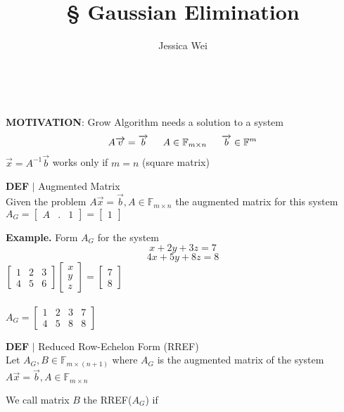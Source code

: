 \documentclass [12pt]{article}
\begin{document}
\begin{center}\title*{\Large \S {} Gaussian Elimination}\\\author*{Jessica Wei} \end{center}
\normalsize
\noindent\textbf{MOTIVATION}: Grow Algorithm needs a solution to a system 
\[A\overrightarrow{v}=\overrightarrow{b}\indent A\in\mathbb{F}_{m\times n}\indent \overrightarrow{b}\in\mathbb{F}^m\]
$\overrightarrow{x}=A^{-1}\overrightarrow{b}$ works only if $m=n$ (square matrix)\\
\begin{framed}
\noindent\textbf{DEF} $|$ Augmented Matrix\\
Given the problem $A\overrightarrow{x}=\overrightarrow{b},A\in\mathbb{F}_{m\times n}$ the augmented matrix for this system\\
$A_G=\begin{bmatrix}
A&.&1
\end{bmatrix}=\begin{bmatrix}
1
\end{bmatrix}$
\end{framed}
\noindent\textbf{Example. }Form $A_G$ for the system
\[x+2y+3z=7\]
\[4x+5y+8z=8\]
$\begin{bmatrix}
1&2&3\\
4&5&6
\end{bmatrix}\begin{bmatrix}
x\\
y\\
z
\end{bmatrix}=\begin{bmatrix}
7\\
8
\end{bmatrix}$\\\\
$A_G=\begin{bmatrix}
1&2&3&7\\
4&5&8&8
\end{bmatrix}$
\begin{framed}
\noindent\textbf{DEF} $|$ Reduced Row-Echelon Form (RREF)\\
Let $A_G,B\in\mathbb{F}_{m\times (n+1)}$ where $A_G$ is the augmented matrix of the system $A\overrightarrow{x}=\overrightarrow{b}, A\in\mathbb{F}_{m\times n}$
\end{framed}
We call matrix $B$ the RREF($A_G$) if 
\end{document}

